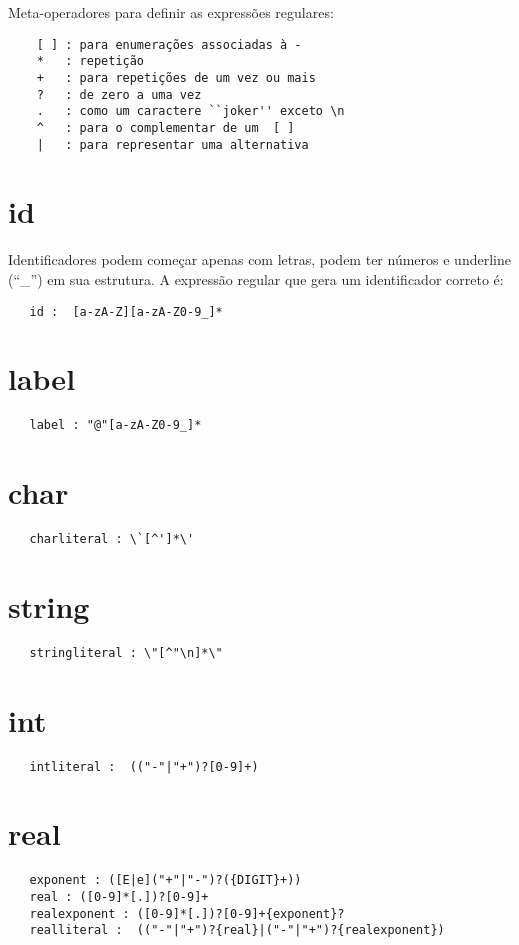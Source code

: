 Meta-operadores para definir as expressões regulares:
\begin{verbatim}
    [ ] : para enumerações associadas à -
    *   : repetição
    +   : para repetições de um vez ou mais
    ?   : de zero a uma vez
    .   : como um caractere ``joker'' exceto \n
    ^   : para o complementar de um  [ ]
    |   : para representar uma alternativa
\end{verbatim}

\section{id}
Identificadores podem começar apenas com letras, podem ter números e underline (``\_'') em sua estrutura. 
A expressão regular que gera um identificador correto é:
 \begin{verbatim}
   id :  [a-zA-Z][a-zA-Z0-9_]*
\end{verbatim}

\section{label}
 \begin{verbatim}
   label : "@"[a-zA-Z0-9_]*
\end{verbatim}

\section{char}
\begin{verbatim}
   charliteral : \`[^']*\'
\end{verbatim}

\section{string}
\begin{verbatim}
   stringliteral : \"[^"\n]*\"
\end{verbatim}

\section{int}
\begin{verbatim}
   intliteral :  (("-"|"+")?[0-9]+)
\end{verbatim}

\section{real}
\begin{verbatim}
   exponent : ([E|e]("+"|"-")?({DIGIT}+))
   real : ([0-9]*[.])?[0-9]+
   realexponent : ([0-9]*[.])?[0-9]+{exponent}?
   realliteral :  (("-"|"+")?{real}|("-"|"+")?{realexponent})
\end{verbatim}

